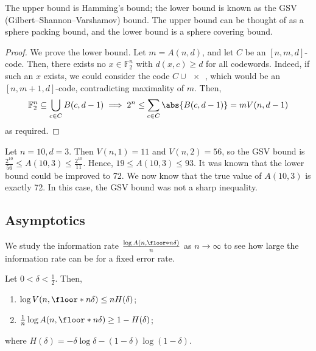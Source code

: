 The upper bound is Hamming's bound; the lower bound is known as the GSV (Gilbert--Shannon--Varshamov) bound.
The upper bound can be thought of as a sphere packing bound, and the lower bound is a sphere covering bound.

\begin{proof}
    We prove the lower bound.
    Let $m = A(n,d)$, and let $C$ be an $[n,m,d]$-code.
    Then, there exists no $x \in \mathbb F_2^n$ with $d(x,c) \geq d$ for all codewords.
    Indeed, if such an $x$ exists, we could consider the code $C \cup \qty{x}$, which would be an $[n,m+1,d]$-code, contradicting maximality of $m$.
    Then,
    \begin{align*}
        \mathbb F_2^n \subseteq \bigcup_{c \in C} B(c,d-1) \implies 2^n \leq \sum_{c \in C} \abs{B(c,d-1)} = mV(n,d-1)
    \end{align*}
    as required.
\end{proof}

\begin{example}
    Let $n = 10, d = 3$.
    Then $V(n,1) = 11$ and $V(n,2) = 56$, so the GSV bound is $\frac{2^{10}}{56} \leq A(10,3) \leq \frac{2^{10}}{11}$.
    Hence, $19 \leq A(10,3) \leq 93$.
    It was known that the lower bound could be improved to 72.
    We now know that the true value of $A(10,3)$ is exactly 72.
    In this case, the GSV bound was not a sharp inequality.
\end{example}

\subsection{Asymptotics}
We study the information rate $\frac{\log A(n,\floor*{n\delta})}{n}$ as $n \to \infty$ to see how large the information rate can be for a fixed error rate.
\begin{proposition} \label{prp:aym}
    Let $0 < \delta < \frac{1}{2}$.
    Then,
    \begin{enumerate}
        \item $\log V(n,\floor*{n\delta}) \leq nH(\delta)$;
        \item $\frac{1}{n} \log A(n,\floor*{n\delta}) \geq 1 - H(\delta)$;
    \end{enumerate}
    where $H(\delta) = -\delta \log \delta - (1-\delta)\log (1-\delta)$.
\end{proposition}

